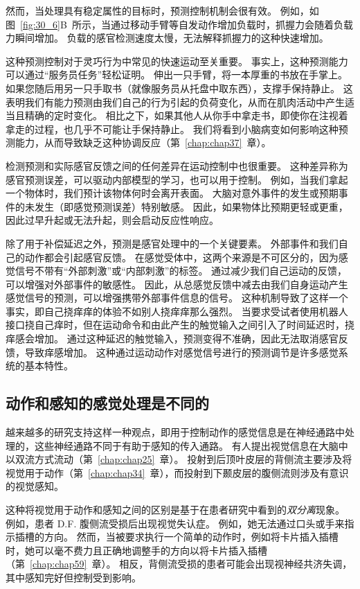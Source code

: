 然而，当处理具有稳定属性的目标时，预测控制机制会很有效。
例如，如图~\ref{fig:30_6}B~所示，当通过移动手臂等自发动作增加负载时，抓握力会随着负载力瞬间增加。
负载的感官检测速度太慢，无法解释抓握力的这种快速增加。


这种预测控制对于灵巧行为中常见的快速运动至关重要。
事实上，这种预测能力可以通过“服务员任务”轻松证明。 
伸出一只手臂，将一本厚重的书放在手掌上。
如果您随后用另一只手取书（就像服务员从托盘中取东西），支撑手保持静止。
这表明我们有能力预测由我们自己的行为引起的负荷变化，从而在肌肉活动中产生适当且精确的定时变化。
相比之下，如果其他人从你手中拿走书，即使你在注视着拿走的过程，也几乎不可能让手保持静止。
我们将看到小脑病变如何影响这种预测能力，从而导致缺乏这种协调反应（第~\ref{chap:chap37}~章）。


检测预测和实际感官反馈之间的任何差异在运动控制中也很重要。
这种差异称为感官预测误差，可以驱动内部模型的学习，也可以用于控制。
例如，当我们拿起一个物体时，我们预计该物体何时会离开表面。
大脑对意外事件的发生或预期事件的未发生（即感觉预测误差）特别敏感。
因此，如果物体比预期更轻或更重，因此过早升起或无法升起，则会启动反应性响应。


除了用于补偿延迟之外，预测是感官处理中的一个关键要素。
外部事件和我们自己的动作都会引起感官反馈。
在感觉受体中，这两个来源是不可区分的，因为感觉信号不带有“外部刺激”或“内部刺激”的标签。
通过减少我们自己运动的反馈，可以增强对外部事件的敏感性。
因此，从总感觉反馈中减去由我们自身运动产生感觉信号的预测，可以增强携带外部事件信息的信号。
这种机制导致了这样一个事实，即自己挠痒痒的体验不如别人挠痒痒那么强烈。
当要求受试者使用机器人接口挠自己痒时，但在运动命令和由此产生的触觉输入之间引入了时间延迟时，挠痒感会增加。
通过这种延迟的触觉输入，预测变得不准确，因此无法取消感官反馈，导致痒感增加。
这种通过运动动作对感觉信号进行的预测调节是许多感觉系统的基本特性。



\subsection{动作和感知的感觉处理是不同的}

越来越多的研究支持这样一种观点，即用于控制动作的感觉信息是在神经通路中处理的，这些神经通路不同于有助于感知的传入通路。
有人提出视觉信息在大脑中以双流方式流动（第~\ref{chap:chap25}~章）。
投射到后顶叶皮层的背侧流主要涉及将视觉用于动作（第~\ref{chap:chap34}~章），而投射到下颞皮层的腹侧流则涉及有意识的视觉感知。


这种将视觉用于动作和感知之间的区别是基于在患者研究中看到的\textit{双分离}现象。
例如，患者 D.F. 腹侧流受损后出现视觉失认症。
例如，她无法通过口头或手来指示插槽的方向。
然而，当被要求执行一个简单的动作时，例如将卡片插入插槽时，她可以毫不费力且正确地调整手的方向以将卡片插入插槽（第~\ref{chap:chap59}~章）。
相反，背侧流受损的患者可能会出现视神经共济失调，其中感知完好但控制受到影响。


